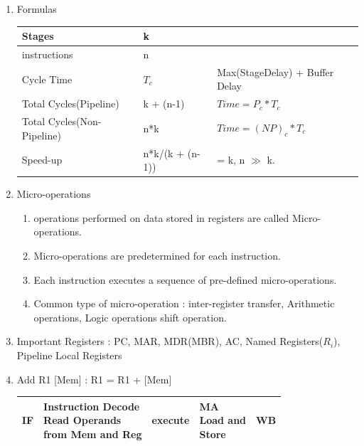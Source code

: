 \begin{enumerate}
    \item Formulas\\
    \begin{myTableStyle} \begin{tabular}{ |m{5cm}|m{3cm}|m{5cm}| } \hline
        Stages                      &  k                & \\ \hline
        instructions                &  n                & \\ \hline
        Cycle Time                  &  \(T_c\)          &  Max(StageDelay) + Buffer Delay\\ \hline
        Total Cycles(Pipeline)      &  k + (n-1)        & \(Time = P_c * T_c\) \\ \hline
        Total Cycles(Non-Pipeline)  &  n*k              & \(Time = (NP)_c * T_c\) \\ \hline
        Speed-up                    &  n*k/(k + (n-1))  & = k, n \(\gg\) k. \\ \hline
    \end{tabular} \end{myTableStyle} \vspace{0.08in}

    \newpage
    \item Micro-operations
    \begin{enumerate}
        \item operations performed on data stored in registers are called Micro-operations.
        \item Micro-operations are predetermined for each instruction.
        \item Each instruction executes a sequence of pre-defined micro-operations.
        \item Common type of micro-operation : inter-register transfer, Arithmetic operations, Logic operations
              shift operation.
    \end{enumerate}

    \item Important Registers : PC, MAR, MDR(MBR), AC, Named Registers(\(R_i\)), Pipeline Local Registers
    \item Add R1 [Mem] : R1 = R1 + [Mem] \\
    \begin{myTableStyle} \begin{tabular}{ |l|l|l|l|l| } \hline
        IF & \makecell[l]{ Instruction Decode \\ Read Operands \\from Mem and Reg}
        &execute & \makecell[l]{ MA \\ Load and \\Store}& WB   \\ \hline


\end{tabular}
\end{myTableStyle}
\end{enumerate}
